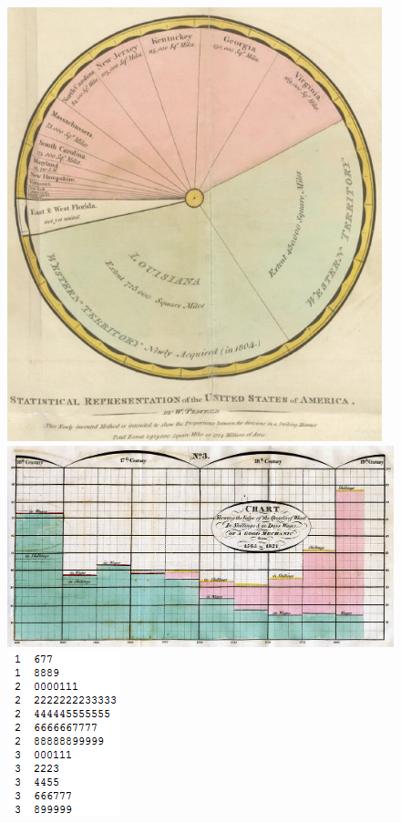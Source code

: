 \documentclass[
  letterpaper,
  DIV=11,
  numbers=noendperiod,
  oneside]{scrartcl}
\begin{document}
\begin{figure}
\begin{minipage}{0.25\linewidth}
\includegraphics{www/playfair-pie-chart.png}

\end{minipage}%
%
\begin{minipage}{0.25\linewidth}

\includegraphics{www/playfair-barchart.png}

\end{minipage}%
%
\begin{minipage}{0.25\linewidth}

\includegraphics{www/thumbnail-stem-and-leaf.png}


\end{minipage}
\end{figure}
\end{document}
